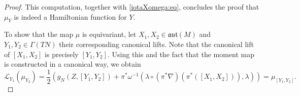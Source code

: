 \documentclass[10pt,a4paper]{amsart}
\newcommand{\aut}{\mathfrak{aut}}
\newcommand{\calL}{\mathcal{L}}
\begin{document}
\begin{proof}
        This computation, together with \eqref{iotaXomega:eq}, concludes the proof that $\mu_Y$ is indeed a Hamiltonian function for $Y$.\medskip
		
		To show that the map $\mu$ is equivariant, let $X_1,X_2\in\aut(M)$ and $Y_1,Y_2\in\Gamma(TN)$ their corresponding canonical lifts. Note that the canonical lift of $[X_1,X_2]$ is precisely $[Y_1,Y_2]$. Using this and the fact that the moment map is constructed in a canonical way, we obtain $$\calL_{Y_1}(\mu_{Y_2})=\frac{1}{2}\left(g_N(Z,[Y_1,Y_2])+\pi^*\omega^{-1}(\lambda\circ(\pi^*\nabla)(\pi^*([X_1,X_2])),\lambda)\right)=\mu_{[Y_1,Y_2]}.$$
	\end{proof}
\end{document}
